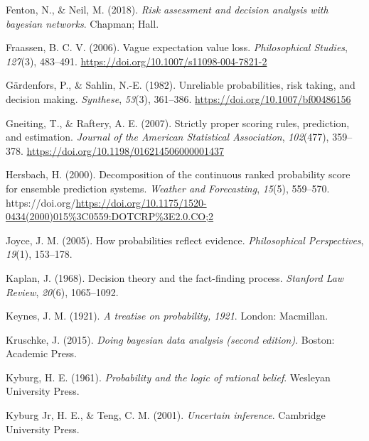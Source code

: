 \documentclass[
  letterpaper,
  DIV=11,
  numbers=noendperiod]{scrartcl}
\newlength{\cslhangindent}
\newlength{\cslentryspacingunit} %
\newenvironment{CSLReferences}[2] %
 {%
  \setlength{\parindent}{0pt}
  \ifodd #1
  \let\oldpar\par
  \def\par{\hangindent=\cslhangindent\oldpar}
  \fi
  \setlength{\parskip}{#2\cslentryspacingunit}
 }%
 {}
\begin{document}
\begin{CSLReferences}{1}{0}
\leavevmode{}%
Fenton, N., \& Neil, M. (2018). \emph{Risk assessment and decision
analysis with bayesian networks}. Chapman; Hall.

\leavevmode{}%
Fraassen, B. C. V. (2006). Vague expectation value loss.
\emph{Philosophical Studies}, \emph{127}(3), 483--491.
\url{https://doi.org/10.1007/s11098-004-7821-2}

\leavevmode{}%
Gärdenfors, P., \& Sahlin, N.-E. (1982). Unreliable probabilities, risk
taking, and decision making. \emph{Synthese}, \emph{53}(3), 361--386.
\url{https://doi.org/10.1007/bf00486156}

\leavevmode{}%
Gneiting, T., \& Raftery, A. E. (2007). Strictly proper scoring rules,
prediction, and estimation. \emph{Journal of the American Statistical
Association}, \emph{102}(477), 359--378.
\url{https://doi.org/10.1198/016214506000001437}

\leavevmode{}%
Hersbach, H. (2000). Decomposition of the continuous ranked probability
score for ensemble prediction systems. \emph{Weather and Forecasting},
\emph{15}(5), 559--570.
https://doi.org/\url{https://doi.org/10.1175/1520-0434(2000)015\%3C0559:DOTCRP\%3E2.0.CO;2}

\leavevmode{}%
Joyce, J. M. (2005). How probabilities reflect evidence.
\emph{Philosophical Perspectives}, \emph{19}(1), 153--178.

\leavevmode{}%
Kaplan, J. (1968). Decision theory and the fact-finding process.
\emph{Stanford Law Review}, \emph{20}(6), 1065--1092.

\leavevmode{}%
Keynes, J. M. (1921). \emph{A treatise on probability, 1921}. London:
Macmillan.

\leavevmode{}%
Kruschke, J. (2015). \emph{Doing bayesian data analysis (second
edition)}. Boston: Academic Press.

\leavevmode{}%
Kyburg, H. E. (1961). \emph{Probability and the logic of rational
belief}. Wesleyan University Press.

\leavevmode{}%
Kyburg Jr, H. E., \& Teng, C. M. (2001). \emph{Uncertain inference}.
Cambridge University Press.


\end{CSLReferences}
\end{document}
